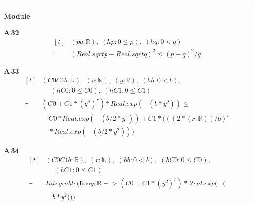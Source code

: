 \vspace{4pt}\noindent\rule{\columnwidth}{0.4pt}\par\vspace{2pt}
\noindent\textbf{Module }\par\vspace{3pt}

\noindent\textbf{A\,32}\quad{}
{\footnotesize\[ \begin{aligned}[t]
&(\mathit{p} \mathit{q} : \mathbb{R} ),\; (\mathit{hp} : 0 \leq \mathit{p}),\; (\mathit{hq} : 0 < \mathit{q})\\
\vdash\;&(\mathit{Real}.\mathit{sqrt} \mathit{p} - \mathit{Real}.\mathit{sqrt} \mathit{q}) ^{2} \leq (\mathit{p} - \mathit{q}) ^{2} / \mathit{q}
\end{aligned} \]}

\noindent\textbf{A\,33}\quad{}
{\footnotesize\[ \begin{aligned}[t]
&(\mathit{C0} \mathit{C1} \mathit{b} : \mathbb{R} ),\; (\mathit{r} : \mathbb{N} ),\; (\mathit{y} : \mathbb{R} ),\; (\mathit{hb} : 0 < \mathit{b}),\\
&\quad \; (\mathit{hC0} : 0 \leq \mathit{C0}),\; (\mathit{hC1} : 0 \leq \mathit{C1})\\
\vdash\;&(\mathit{C0} + \mathit{C1} * (\mathit{y} ^{2}) ^{\mathit{r}}) * \mathit{Real}.\mathit{exp} (-(\mathit{b} * \mathit{y} ^{2})) \leq\\
&\quad \mathit{C0} * \mathit{Real}.\mathit{exp} (-(\mathit{b} / 2 * \mathit{y} ^{2})) + \mathit{C1} * (((2 * (\mathit{r} : \mathbb{R} )) / \mathit{b}) ^{\mathit{r}}\\
&\quad * \mathit{Real}.\mathit{exp} (-(\mathit{b} / 2 * \mathit{y} ^{2})))
\end{aligned} \]}

\noindent\textbf{A\,34}\quad{}
{\footnotesize\[ \begin{aligned}[t]
&(\mathit{C0} \mathit{C1} \mathit{b} : \mathbb{R} ),\; (\mathit{r} : \mathbb{N} ),\; (\mathit{hb} : 0 < \mathit{b}),\; (\mathit{hC0} : 0 \leq \mathit{C0}),\\
&\quad \; (\mathit{hC1} : 0 \leq \mathit{C1})\\
\vdash\;&\mathit{Integrable} (\mathbf{fun} \mathit{y} : \mathbb{R} => (\mathit{C0} + \mathit{C1} * (\mathit{y} ^{2}) ^{\mathit{r}}) * \mathit{Real}.\mathit{exp} (-(\\
&\quad \mathit{b} * \mathit{y} ^{2})))
\end{aligned} \]}

